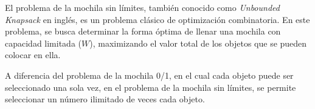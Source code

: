 El problema de la mochila sin límites, también conocido como \emph{Unbounded Knapsack} en inglés, es un problema clásico de optimización combinatoria. En este problema, se busca determinar la forma óptima de llenar una mochila con capacidad limitada ($W$), maximizando el valor total de los objetos que se pueden colocar en ella.

A diferencia del problema de la mochila 0/1, en el cual cada objeto puede ser seleccionado una sola vez, en el problema de la mochila sin límites, se permite seleccionar un número ilimitado de veces cada objeto.